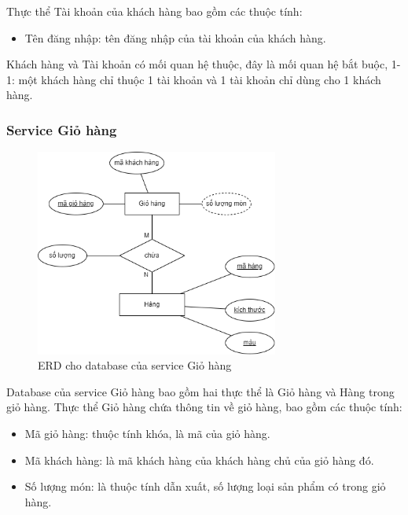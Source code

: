 \par Thực thể Tài khoản của khách hàng bao gồm các thuộc tính:
\begin{itemize}
    \item Tên đăng nhập: tên đăng nhập của tài khoản của khách hàng.
\end{itemize}
 
\par Khách hàng và Tài khoản có mối quan hệ thuộc, đây là mối quan hệ bắt buộc, 1-1: một khách hàng chỉ thuộc 1 tài khoản và 1 tài khoản chỉ dùng cho 1 khách hàng.
 
\newpage

\subsubsection{Service Giỏ hàng}
\begin{figure}[!htp]
	\begin{center}
		\includegraphics[width=8cm]{img/database/erd/eerd-cart.png}
		\newline
		\caption{ERD cho database của service Giỏ hàng}
	\end{center}
\end{figure}

\par Database của service Giỏ hàng bao gồm hai thực thể là Giỏ hàng và Hàng trong giỏ hàng. Thực thể Giỏ hàng chứa thông tin về giỏ hàng, bao gồm các thuộc tính:
\begin{itemize}
	\item Mã giỏ hàng: thuộc tính khóa, là mã của giỏ hàng.
	\item Mã khách hàng: là mã khách hàng của khách hàng chủ của giỏ hàng đó.
	\item Số lượng món: là thuộc tính dẫn xuất, số lượng loại sản phẩm có trong giỏ hàng.
\end{itemize}

